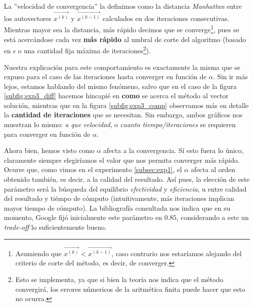 \par La ''velocidad de convergencia'' la definimos como la distancia
\emph{Manhattan} entre los autovectores $\vec{x^{(k)}}$ y $\vec{x^{(k-1)}}$
calculados en dos iteraciones consecutivas. Mientras mayor sea la distancia,
m\'as r\'apido decimos que se converge\footnote{Asumiendo que $\vec{x^{(k)}} <
\vec{x^{(k-1)}}$, caso contrario nos estar\'iamos alejando del criterio de corte
del m\'etodo, es decir, de converger.}, pues se est\'a acerc\'andose cada vez
\textbf{m\'as rápido} al umbral de corte del algoritmo (basado en $\epsilon$ o
una cantidad fija m\'axima de iteraciones\footnote{Esto se implementa, ya que si
bien la teor\'ia nos indica que el m\'etodo convergir\'a, los errores
n\'umericos de la aritm\'etica finita puede hacer que esto no ocurra.}).

\par Nuestra explicaci\'on para este comportamiento es exactamente la misma que
se expuso para el caso de las iteraciones hasta converger en funci\'on de
$\alpha$. Sin ir m\'as lejos, estamos hablando del mismo fen\'omeno, salvo que
en el caso de la figura \ref{subfig:exp3_diff} hacemos hincapi\'e en
\textbf{como} se acerca el m\'etodo al vector soluci\'on, mientras que en la figura
\ref{subfig:exp3_comp} observamos m\'as en detalle la \textbf{cantidad de
iteraciones} que se necesitan. Sin embargo, ambos gr\'aficos nos muestran lo
mismo: \textit{a que velocidad}, o \textit{cuanto tiempo/iteraciones} se
requieren para converger en funci\'on de $\alpha$.

\par Ahora bien, hemos visto como $\alpha$ afecta a la convergencia. S\'i esto
fuera lo \'unico, claramente siempre elegir\'iamos el valor que nos permita
converger m\'as r\'apido. Ocurre que, como vimos en el experimento
\ref{subsec:exp1}, el $\alpha$ afecta al orden obtenido tambi\'en, es decir, a
la calidad del resultado. As\'i pues, la elecci\'on de este par\'ametro ser\'a
la b\'usqueda del equilibrio \emph{efectividad} y \emph{eficiencia}, u entre
calidad del resultado y ti\'empo de c\'omputo (intuitivamente, m\'as iteraciones
implican mayor tiempo de c\'omputo). La bibliograf\'ia consultada nos indica que
en su momento, Google fij\'o inicialmente este par\'ametro en $0.85$,
considerando a este un \emph{trade-off} lo suficientemente
bueno\cite{Bryan2006}\cite{Langville2006}.

